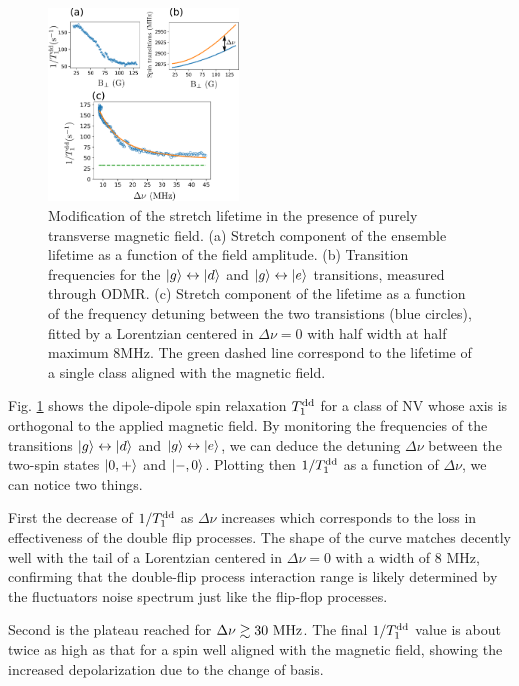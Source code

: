 \documentclass[preprintnumbers,amsmath,amssymb,superscriptaddress,twocolumn,showpacs]{revtex4-2}
\begin{document}
\begin{figure}
\includegraphics[width=0.45\textwidth]{Figures/fig transverse field}
\caption{Modification of the stretch lifetime in the presence of purely transverse magnetic field. (a) Stretch component of the ensemble lifetime as a function of the field amplitude. (b) Transition frequencies for the $\ket{g} \leftrightarrow \ket{d}$ and $\ket{g} \leftrightarrow \ket{e}$ transitions, measured through ODMR. (c) Stretch component of the lifetime as a function of the frequency detuning between the two transistions (blue circles), fitted by a Lorentzian centered in $\Delta \nu=0$ with half width at half maximum 8MHz. The green dashed line correspond to the lifetime of a single class aligned with the magnetic field.}
\label{exp_B_transverse}
\end{figure}

Fig. \ref{exp_B_transverse} shows the dipole-dipole spin relaxation $T_1^{\rm dd}$ for a class of NV whose axis is orthogonal to the applied magnetic field. By monitoring the frequencies of the transitions $\ket{g} \leftrightarrow \ket{d}$ and $\ket{g} \leftrightarrow \ket{e}$, we can deduce the detuning $\Delta \nu$ between the two-spin states $\ket{0,+}$ and $\ket{-,0}$. Plotting then $1/T_1^{\rm dd}$ as a function of $\Delta \nu$, we can notice two things. 

First the decrease of $1/T_1^{\rm dd}$ as $\Delta \nu$ increases which corresponds to the loss in effectiveness of the double flip processes. The shape of the curve matches decently well with the tail of a Lorentzian centered in $\Delta \nu=0$ with a width of 8 MHz, confirming that the double-flip process interaction range is likely determined by the fluctuators noise spectrum just like the flip-flop processes. 

Second is the plateau reached for $\Delta \nu \gtrsim 30\ \rm MHz$. The final $1/T_1^{\rm dd}$ value is about twice as high as that for a spin well aligned with the magnetic field, showing the increased depolarization due to the change of basis.
\end{document}

